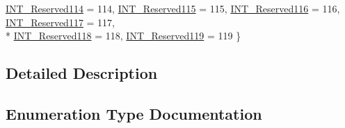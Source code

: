 \begin{DoxyCompactItemize}
\hyperlink{group___interrupt__vector__numbers_gga5f3656e2a154b64aa378a2f3856c3a8daa74e03841c82de001200437b6c56897f}{I\+N\+T\+\_\+\+Reserved114} = 114, 
\hyperlink{group___interrupt__vector__numbers_gga5f3656e2a154b64aa378a2f3856c3a8da86d2daf0a83f47905aec20b38d9bec9c}{I\+N\+T\+\_\+\+Reserved115} = 115, 
\hyperlink{group___interrupt__vector__numbers_gga5f3656e2a154b64aa378a2f3856c3a8daefd5b3ac22c9d27bf0a12236715ef236}{I\+N\+T\+\_\+\+Reserved116} = 116, 
\hyperlink{group___interrupt__vector__numbers_gga5f3656e2a154b64aa378a2f3856c3a8da8eee96d711146e3df46960a0dd572a50}{I\+N\+T\+\_\+\+Reserved117} = 117, 
\\*
\hyperlink{group___interrupt__vector__numbers_gga5f3656e2a154b64aa378a2f3856c3a8da481831d431f329cabbe9a4cb551607cb}{I\+N\+T\+\_\+\+Reserved118} = 118, 
\hyperlink{group___interrupt__vector__numbers_gga5f3656e2a154b64aa378a2f3856c3a8da50834bcd00063726258ab689d7d102b1}{I\+N\+T\+\_\+\+Reserved119} = 119
 \}
\end{DoxyCompactItemize}


\subsection{Detailed Description}


\subsection{Enumeration Type Documentation}
